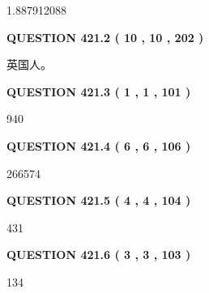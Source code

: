 \documentclass{ctexart}
\begin{document}
1.887912088
 
 
  
\vspace{0.2in}
  
{\textbf{\Large{QUESTION
421.2 
 ( 10 , 10 , 202 )
}}}
  
  
 
 
\noindent{}
 
 
英国人。
 
 
 
 
  
\vspace{0.2in}
  
{\textbf{\Large{QUESTION
421.3 
 ( 1 , 1 , 101 )
}}}
  
  
 
 
\noindent{}

940
 
 
  
\vspace{0.2in}
  
{\textbf{\Large{QUESTION
421.4 
 ( 6 , 6 , 106 )
}}}
  
  
 
 
\noindent{}

266574
 
 
  
\vspace{0.2in}
  
{\textbf{\Large{QUESTION
421.5 
 ( 4 , 4 , 104 )
}}}
  
  
 
 
\noindent{}

431
 
 
  
\vspace{0.2in}
  
{\textbf{\Large{QUESTION
421.6 
 ( 3 , 3 , 103 )
}}}
  
  
 
 
\noindent{}

134
 
 
  
\vspace{0.2in}
  
\end{document}
